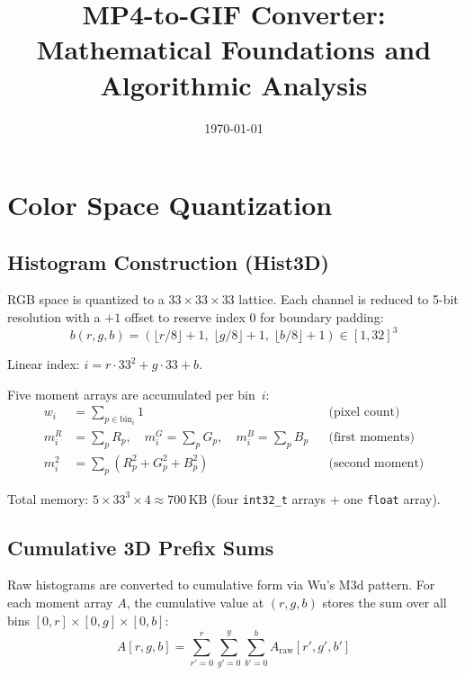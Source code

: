 \documentclass[11pt,a4paper]{article}
\title{MP4-to-GIF Converter:\\Mathematical Foundations and Algorithmic Analysis}
\author{}
\date{\today}
\begin{document}
\maketitle
\tableofcontents
\newpage

\section{Color Space Quantization}

\subsection{Histogram Construction (Hist3D)}

RGB space is quantized to a $33 \times 33 \times 33$ lattice.
Each channel is reduced to 5-bit resolution with a $+1$ offset to reserve
index 0 for boundary padding:
\begin{equation}
  b(r,g,b) = \left(\lfloor r/8 \rfloor + 1,\;
               \lfloor g/8 \rfloor + 1,\;
               \lfloor b/8 \rfloor + 1\right)
             \in [1,32]^3
\end{equation}

Linear index: $i = r \cdot 33^2 + g \cdot 33 + b$.

Five moment arrays are accumulated per bin~$i$:
\begin{align}
  w_i     &= \sum_{p \in \mathrm{bin}_i} 1
             & &\text{(pixel count)} \\
  m^R_i   &= \sum_{p} R_p,\quad
  m^G_i    = \sum_{p} G_p,\quad
  m^B_i    = \sum_{p} B_p
             & &\text{(first moments)} \\
  m^2_i   &= \sum_{p} (R_p^2 + G_p^2 + B_p^2)
             & &\text{(second moment)}
\end{align}

Total memory: $5 \times 33^3 \times 4 \approx 700\,\text{KB}$
(four \texttt{int32\_t} arrays + one \texttt{float} array).

\subsection{Cumulative 3D Prefix Sums}

Raw histograms are converted to cumulative form via Wu's M3d pattern.
For each moment array $A$, the cumulative value at $(r,g,b)$ stores the
sum over all bins $[0,r] \times [0,g] \times [0,b]$:
\begin{equation}
  A[r,g,b] = \sum_{r'=0}^{r} \sum_{g'=0}^{g} \sum_{b'=0}^{b}
              A_{\mathrm{raw}}[r',g',b']
\end{equation}
\end{document}
